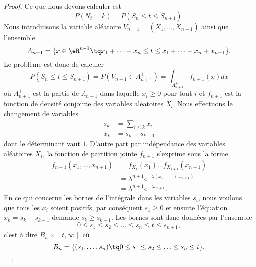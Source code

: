 \begin{proof}
Ce que nous devons calculer est
\begin{equation}
    P(N_t=k)=P(S_{n}\leq t\leq S_{n+1}).
\end{equation}
Nous introduisons la variable aléatoire \( V_{n=1}=(X_1,\ldots,X_{n+1})\) ainsi que l'ensemble
\begin{equation}
    A_{n+1}=\{ x\in\eR^{n+1}\tq x_1+\cdots+x_n\leq t\leq x_1+\cdots+x_n+x_{n+1} \}.
\end{equation}
Le problème est donc de calculer
\begin{equation}
    P(S_n\leq t\leq S_{n+1})=P(V_{n+1}\in A_{n+1}^+)=\int_{A_{n+1}^+}f_{n+1}(x)dx
\end{equation}
où \( A_{n+1}^+\) est la partie de $A_{n+1}$ dans laquelle \( x_i\geq 0\) pour tout \( i\) et \( f_{n+1}\) est la fonction de densité conjointe des variables aléatoires \( X_i\). Nous effectuons le changement de variables
\begin{subequations}
    \begin{align}
        s_k&=\sum_{i\leq k}x_i\\
        x_k&=s_k-s_{k-1}
    \end{align}
\end{subequations}
dont le déterminant vaut \( 1\). D'autre part par indépendance des variables aléatoires \( X_i\), la fonction de partition jointe \( f_{n+1}\) s'exprime sous la forme
\begin{subequations}
    \begin{align}
        f_{n+1}(x_1,\ldots,x_{n+1})&=f_{X_1}(x_1)\ldots f_{X_{n+1}}(x_{n+1})\\
        &=\lambda^{n+1} e^{-\lambda(x_1+\cdots+x_{n+1})}\\
        &=\lambda^{n+1} e^{-\lambda s_{n+1}}.
    \end{align}
\end{subequations}
En ce qui concerne les bornes de l'intégrale dans les variables \( s_i\), nous voulons que tous les \( x_i\) soient positifs, par conséquent \( s_1\geq 0\) et ensuite l'équation \( x_k=s_k-s_{k-1}\) demande \( s_k\geq s_{k-1}\). Les bornes sont donc données par l'ensemble
\begin{equation}
    0\leq s_1\leq s_2\leq\ldots\leq s_n\leq t\leq s_{n+1},
\end{equation}
c'est à dire \( B_n\times \mathopen] t , \infty \mathclose[\) où 
\begin{equation}
    B_n=\{ (s_1,\ldots,s_n)\tq 0\leq s_1\leq s_2\leq\ldots\leq s_n\leq t \}.

\end{equation}
\end{proof}
